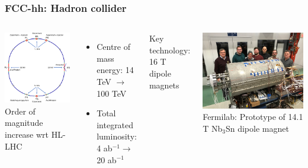 \documentclass[aspectratio=169]{beamer}
\newcommand{\bluetext}[1]{%
  \textcolor{myBlue}{#1}
}
\begin{document}
\begin{frame}
  \frametitle{FCC-hh: Hadron collider}
   \begin{columns}[c]
     \includegraphics[width=1.0\linewidth]{figures/FCC_hh_ring.pdf}\\
     
      \bluetext{Order of magnitude increase wrt HL-LHC}
      \begin{itemize}
      \item Centre of mass energy: 14 TeV $\rightarrow$ 100 TeV
      \item Total integrated luminosity: 4 ab$^{-1} \rightarrow$ 20 ab$^{-1}$
      \end{itemize}
      
      \bluetext{Key technology: 16 T dipole magnets}
      \begin{center}
        \includegraphics[width=.45\linewidth]{figures/fermilab-magnets-newdipole-small.jpg}\\
         {\small{Fermilab: Prototype of 14.1 T Nb$_3$Sn dipole magnet}}
       \end{center}     
   \end{columns}

\end{frame}
\end{document}
